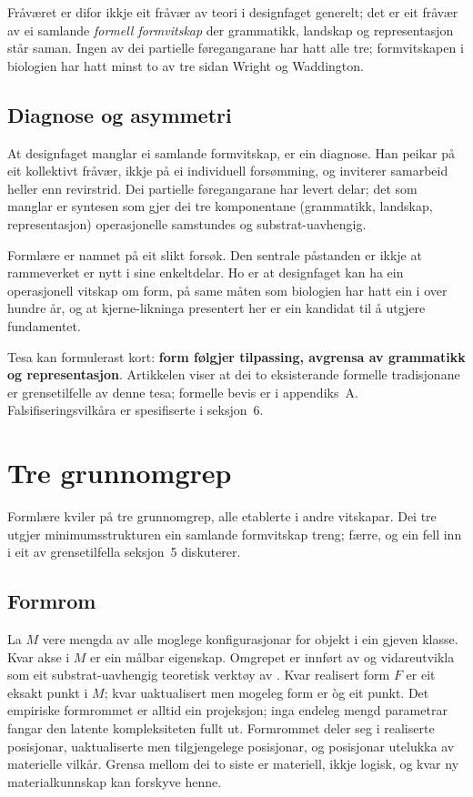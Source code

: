 \documentclass[11pt,a4paper]{article}
\begin{document}
Fråværet er difor ikkje eit fråvær av teori i designfaget generelt; det er eit fråvær av ei samlande \textit{formell formvitskap} der grammatikk, landskap og representasjon står saman. Ingen av dei partielle føregangarane har hatt alle tre; formvitskapen i biologien har hatt minst to av tre sidan Wright og Waddington.

\subsection{Diagnose og asymmetri}

At designfaget manglar ei samlande formvitskap, er ein diagnose. Han peikar på eit kollektivt fråvær, ikkje på ei individuell forsømming, og inviterer samarbeid heller enn revirstrid. Dei partielle føregangarane har levert delar; det som manglar er syntesen som gjer dei tre komponentane (grammatikk, landskap, representasjon) operasjonelle samstundes og substrat-uavhengig.

Formlære er namnet på eit slikt forsøk. Den sentrale påstanden er ikkje at rammeverket er nytt i sine enkeltdelar. Ho er at designfaget kan ha ein operasjonell vitskap om form, på same måten som biologien har hatt ein i over hundre år, og at kjerne-likninga presentert her er ein kandidat til å utgjere fundamentet.

Tesa kan formulerast kort: \textbf{form følgjer tilpassing, avgrensa av grammatikk og representasjon}. Artikkelen viser at dei to eksisterande formelle tradisjonane er grensetilfelle av denne tesa; formelle bevis er i appendiks~A. Falsifiseringsvilkåra er spesifiserte i seksjon~6.

\section{Tre grunnomgrep}

Formlære kviler på tre grunnomgrep, alle etablerte i andre vitskapar. Dei tre utgjer minimumsstrukturen ein samlande formvitskap treng; færre, og ein fell inn i eit av grensetilfella seksjon~5 diskuterer.

\subsection{Formrom}

La $M$ vere mengda av alle moglege konfigurasjonar for objekt i ein gjeven klasse. Kvar akse i $M$ er ein målbar eigenskap. Omgrepet er innført av \citet{raup1966} og vidareutvikla som eit substrat-uavhengig teoretisk verktøy av \citet{mitteroecker2009}. Kvar realisert form $F$ er eit eksakt punkt i $M$; kvar uaktualisert men mogeleg form er òg eit punkt. Det empiriske formrommet er alltid ein projeksjon; inga endeleg mengd parametrar fangar den latente kompleksiteten fullt ut. Formrommet deler seg i realiserte posisjonar, uaktualiserte men tilgjengelege posisjonar, og posisjonar utelukka av materielle vilkår. Grensa mellom dei to siste er materiell, ikkje logisk, og kvar ny materialkunnskap kan forskyve henne.
\end{document}
